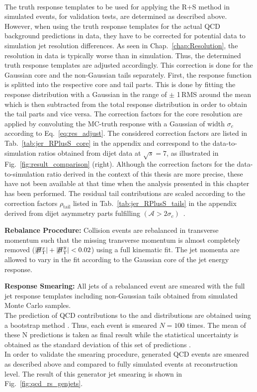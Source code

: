 \begin{description}
\\
The truth response templates to be used for applying the R+S method in simulated events, \eg for validation tests, are determined as described above. However, when using the truth response templates for the actual QCD background predictions in data, they have to be corrected for potential data to simulation jet resolution differences. As seen in Chap.~\ref{chap:Resolution}, the resolution in data is typically worse than in simulation. Thus, the determined truth response templates are adjusted accordingly. This correction is done for the Gaussian core and the non-Gaussian tails separately. First, the response function is splitted into the respective core and tail parts. This is done by fitting the response distribution with a Gaussian in the range of $\pm$ 1\,RMS around the mean which is then subtracted from the total response distribution in order to obtain the tail parts and vice versa. The correction factors for the core resolution are applied by convoluting the MC-truth response with a Gaussian of width $\sigma_{c}$ according to Eq.~\ref{eq:res_adjust}. The considered correction factors are listed in Tab.~\ref{tab:jer_RPlusS_core} in the appendix and correspond to the data-to-simulation ratios obtained from dijet data at $\sqrt{s} = 7$\tev, as illustrated in Fig.~\ref{fig:result_comparison} (right). Although the correction factors for the data-to-simulation ratio derived in the context of this thesis are more precise, these have not been available at that time when the analysis presented in this chapter has been performed. The residual tail contributions are scaled according to the correction factors $\rho_\mathrm{tail}$ listed in Tab.~\ref{tab:jer_RPlusS_tails} in the appendix derived from dijet asymmetry parts fulfilling $(\mathcal{A} > 2 \sigma_c)$~\cite{thesis:Schroeder}.   

 \item \textbf{Rebalance Procedure:}
Collision events are rebalanced in transverse momentum such that the missing transverse momentum is almost completely removed ($|\slash\mkern-12mu{H}_{\text{T}}^x| + |\slash\mkern-12mu{H}_{\text{T}}^y| < 0.02$) using a full kinematic fit. The jet momenta are allowed to vary in the fit according to the Gaussian core of the jet energy response. \\

 \item \textbf{Response Smearing:}
All jets of a rebalanced event are smeared with the full jet response templates including non-Gaussian tails obtained from simulated Monte Carlo samples. \\
The prediction of QCD contributions to the \HT and \MHT distributions are obtained using a bootstrap method . Thus, each event is smeared $N = 100$ times. The mean of these N predictions is taken as final result while the statistical uncertainty is obtained as the standard deviation of this set of predictions .\\
In order to validate the smearing procedure, generated QCD events are smeared as described above and compared to fully simulated events at reconstruction level. The result of this generator jet smearing is shown in Fig.~\ref{fig:qcd_rs_genjets}. \\


\end{description}

